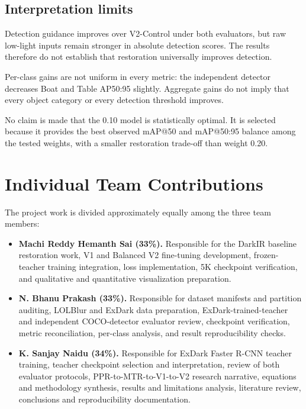 \subsection{Interpretation limits}

Detection guidance improves over V2-Control under both evaluators, but raw
low-light inputs remain stronger in absolute detection scores. The results
therefore do not establish that restoration universally improves detection.

Per-class gains are not uniform in every metric: the independent detector
decreases Boat and Table AP50:95 slightly. Aggregate gains do not imply
that every object category or every detection threshold improves.

No claim is made that the 0.10 model is statistically optimal. It is
selected because it provides the best observed mAP@50 and mAP@50:95 balance
among the tested weights, with a smaller restoration trade-off than weight
0.20.

\section{Individual Team Contributions}
\label{sec:contributions}

The project work is divided approximately equally among the three team
members:
\begin{itemize}
  \item \textbf{Machi Reddy Hemanth Sai (33\%).}
  Responsible for the DarkIR baseline restoration work, V1 and Balanced V2
  fine-tuning development, frozen-teacher training integration, loss
  implementation, 5K checkpoint verification, and qualitative and
  quantitative visualization preparation.

  \item \textbf{N. Bhanu Prakash (33\%).}
  Responsible for dataset manifests and partition auditing, LOLBlur and
  ExDark data preparation, ExDark-trained-teacher and independent
  COCO-detector evaluator review, checkpoint verification, metric
  reconciliation, per-class analysis, and result reproducibility checks.

  \item \textbf{K. Sanjay Naidu (34\%).}
  Responsible for ExDark Faster R-CNN teacher training, teacher checkpoint
  selection and interpretation, review of both evaluator protocols,
  PPR-to-MTR-to-V1-to-V2 research narrative, equations and methodology
  synthesis, results and limitations analysis, literature review,
  conclusions and reproducibility documentation.
\end{itemize}

